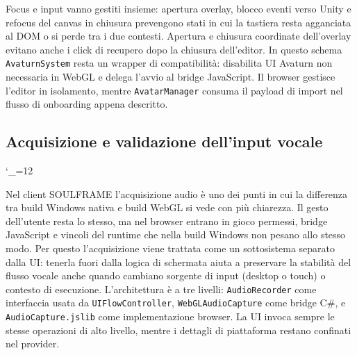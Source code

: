 Focus e input vanno gestiti insieme: apertura overlay, blocco eventi verso Unity e refocus del canvas in chiusura prevengono stati in cui la tastiera resta agganciata al DOM o si perde tra i due contesti. Apertura e chiusura coordinate dell'overlay evitano anche i click di recupero dopo la chiusura dell'editor. In questo schema \texttt{AvaturnSystem} resta un wrapper di compatibilità: disabilita UI Avaturn non necessaria in WebGL e delega l'avvio al bridge JavaScript. Il browser gestisce l'editor in isolamento, mentre \texttt{AvatarManager} consuma il payload di import nel flusso di onboarding appena descritto.

\endgroup

\subsection{Acquisizione e validazione dell'input vocale}
\label{subsec:audio-capture}\label{subsec:voice-validation}
\begingroup
\setlength{\emergencystretch}{3em}
\hfuzz=200pt
\sloppy
\catcode`\_=12\relax

Nel client SOULFRAME l'acquisizione audio è uno dei punti in cui la differenza tra build Windows nativa e build WebGL si vede con più chiarezza. Il gesto dell'utente resta lo stesso, ma nel browser entrano in gioco permessi, bridge JavaScript e vincoli del runtime che nella build Windows non pesano allo stesso modo. Per questo l'acquisizione viene trattata come un sottosistema separato dalla UI: tenerla fuori dalla logica di schermata aiuta a preservare la stabilità del flusso vocale anche quando cambiano sorgente di input (desktop o touch) o contesto di esecuzione. L'architettura è a tre livelli: \texttt{AudioRecorder} come interfaccia usata da \texttt{UIFlowController}, \texttt{WebGLAudioCapture} come bridge C\#, e \texttt{AudioCapture.jslib} come implementazione browser. La UI invoca sempre le stesse operazioni di alto livello, mentre i dettagli di piattaforma restano confinati nel provider.

